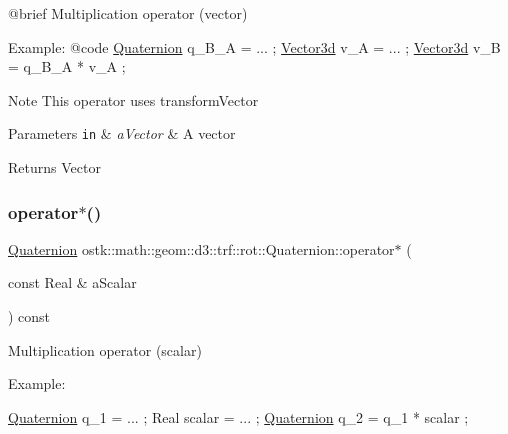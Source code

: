 \begin{DoxyCode}
    @brief              Multiplication operator (vector)
   
    Example:
    @code
                        \hyperlink{classostk_1_1math_1_1geom_1_1d3_1_1trf_1_1rot_1_1_quaternion_ad9fd7d8eb5effb4d4e0394bbb5bb86dc}{Quaternion} q\_B\_A = ... ;
                        \hyperlink{namespaceostk_1_1math_1_1obj_a18744cbf433bce59f6758d9fe3b1dff1}{Vector3d} v\_A = ... ;
                        \hyperlink{namespaceostk_1_1math_1_1obj_a18744cbf433bce59f6758d9fe3b1dff1}{Vector3d} v\_B = q\_B\_A * v\_A ;
\end{DoxyCode}


\begin{DoxyNote}{Note}
This operator uses transform\+Vector
\end{DoxyNote}

\begin{DoxyParams}[1]{Parameters}
\mbox{\tt in}  & {\em a\+Vector} & A vector \\
\hline
\end{DoxyParams}
\begin{DoxyReturn}{Returns}
Vector 
\end{DoxyReturn}
\mbox{\label{classostk_1_1math_1_1geom_1_1d3_1_1trf_1_1rot_1_1_quaternion_a34a6dbc0866d97c3806a0566cc9b23b3}} 
\subsubsection{\texorpdfstring{operator$\ast$()}{operator*()}\hspace{0.1cm}{\footnotesize\ttfamily [2/2]}}
{\footnotesize\ttfamily \hyperlink{classostk_1_1math_1_1geom_1_1d3_1_1trf_1_1rot_1_1_quaternion}{Quaternion} ostk\+::math\+::geom\+::d3\+::trf\+::rot\+::\+Quaternion\+::operator$\ast$ (\begin{DoxyParamCaption}\item[{const Real \&}]{a\+Scalar }\end{DoxyParamCaption}) const}



Multiplication operator (scalar) 

Example\+: 
\begin{DoxyCode}
\hyperlink{classostk_1_1math_1_1geom_1_1d3_1_1trf_1_1rot_1_1_quaternion_ad9fd7d8eb5effb4d4e0394bbb5bb86dc}{Quaternion} q\_1 = ... ;
Real scalar = ... ;
\hyperlink{classostk_1_1math_1_1geom_1_1d3_1_1trf_1_1rot_1_1_quaternion_ad9fd7d8eb5effb4d4e0394bbb5bb86dc}{Quaternion} q\_2 = q\_1 * scalar ;
\end{DoxyCode}



